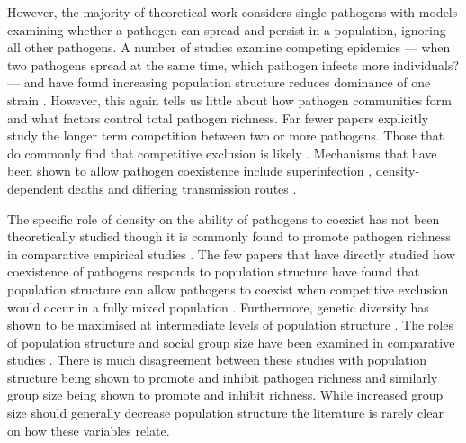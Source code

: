 However, the majority of theoretical work considers single pathogens with models examining whether a pathogen can spread and persist in a population, ignoring all other pathogens.
A number of studies examine competing epidemics --- when two pathogens spread at the same time, which pathogen infects more individuals? --- and have found increasing population structure reduces dominance of one strain \cite{van2014domination, poletto2013host, poletto2015characterising}.
However, this again tells us little about how pathogen communities form and what factors control total pathogen richness.
Far fewer papers explicitly study the longer term competition between two or more pathogens.
Those that do commonly find that competitive exclusion is likely \cite{castillo1995dynamics, bremermann1989competitive, martcheva2013competitive, ackleh2003competitive, ackleh2014robust, turner2002impact}.
Mechanisms that have been shown to allow pathogen coexistence include superinfection \cite{may1994superinfection, li2010age}, density-dependent deaths \cite{ackleh2003competitive, kirupaharan2004coexistence} and differing transmission routes \cite{allen2003dynamics}.

The specific role of density on the ability of pathogens to coexist has not been theoretically studied though it is commonly found to promote pathogen richness in comparative empirical studies \cite{kamiya2014determines, nunn2003comparative, arneberg2002host}.
The few papers that have directly studied how coexistence of pathogens responds to population structure have found that population structure can allow pathogens to coexist when competitive exclusion would occur in a fully mixed population \cite{qiu2013vector, allen2004sis, nunes2006localized}.
Furthermore, genetic diversity has shown to be maximised at intermediate levels of population structure \cite{campos2006pathogen}.
The roles of population structure and social group size have been examined in comparative studies \cite{maganga2014bat, gay2014parasite, turmelle2009correlates, altizer2003social, bordes2007rodent, ezenwa2006host, rifkin2012animals, vitone2004body}.
There is much disagreement between these studies with population structure being shown to promote \cite{maganga2014bat, turmelle2009correlates} and inhibit pathogen richness \cite{gay2014parasite} and similarly group size being shown to promote \cite{rifkin2012animals, bordes2007rodent} and inhibit \cite{ezenwa2006host} richness.
While increased group size should generally decrease population structure the literature is rarely clear on how these variables relate.



